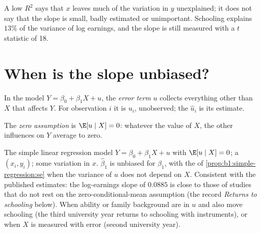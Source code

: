 \label{lst:b1:simple-regression:r2}

\label{out:b1:simple-regression:r2}

A low $R^2$ says that $x$ leaves much of the variation in $y$ unexplained; it does
not say that the slope is small, badly estimated or unimportant. Schooling
explains $13\%$ of the variance of log earnings, and the slope is still
measured with a $t$ statistic of 18.

\section{When is the slope unbiased?}\label{sec:b1:simple-regression:unbiased}

\begin{definition}\label{def:b1:simple-regression:error}
In the model $Y = \beta_0 + \beta_1X + u$, the \emph{error term} $u$ collects everything other than $X$
that affects $Y$. For observation $i$ it is $u_i$, unobserved; the  $\hat u_i$ is
its estimate.
\end{definition}

\begin{definition}\label{def:b1:simple-regression:zcm}
The \emph{zero  assumption} is $\E[u \mid X] = 0$: whatever the value of $X$,
the other influences on $Y$ average to zero.
\end{definition}

\begin{model}{The simple linear regression model}
\assumes $Y = \beta_0 + \beta_1X + u$ with $\E[u \mid X] = 0$; a  $(x_i, y_i)$; some
variation in $x$.
\predicts $\hat\beta_1$ is unbiased for $\beta_1$, with the  of
\cref{prop:b1:simple-regression:se} when the variance of $u$ does not depend on $X$.
\tested Consistent with the published estimates: the log-earnings slope
of $0.0885$ is close to those of studies that do not rest on the
zero-conditional-mean assumption (the record \emph{Returns to schooling}
below). %
\breaks When ability or family background are in $u$ and also move schooling
(the third university year returns to schooling with instruments), or
when $X$ is measured with error (second university year).
\end{model}

